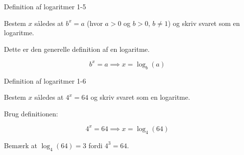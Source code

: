 \documentclass{article}
\begin{document}
\newpage

\begin{exercise}{Definition af logaritmer 1-5}

Bestem $x$ således at $b^x = a$ (hvor $a > 0$ og $b > 0$, $b \neq 1$) og skriv svaret som en logaritme.


\hint

Dette er den generelle definition af en logaritme.

\hint
\[
b^x = a \implies x = \log_b(a)
\]

\end{exercise}

\newpage

\begin{exercise}{Definition af logaritmer 1-6}

Bestem $x$ således at $4^x = 64$ og skriv svaret som en logaritme.


\hint

Brug definitionen:

\hint
\[
4^x = 64 \implies x = \log_4(64)
\]

\hint

Bemærk at $\log_4(64) = 3$ fordi $4^3 = 64$.

\end{exercise}
\end{document}
